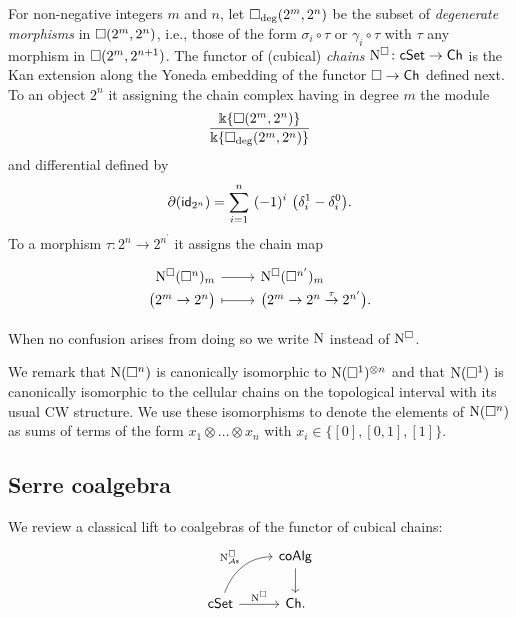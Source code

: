For non-negative integers $m$ and $n$, let $\square_{\deg}(2^m, 2^n)$ be the subset of \textit{degenerate morphisms} in $\square(2^m, 2^n)$, i.e., those of the form $\sigma_i \circ \tau$ or $\gamma_i \circ \tau$ with $\tau$ any morphism in $\square(2^m, 2^{n+1})$.
The functor of (cubical) \textit{chains} $\operatorname{N^{\square}} \colon \mathsf{cSet} \to \mathsf{Ch}$ is the Kan extension along the Yoneda embedding of the functor $\square \to \mathsf{Ch}$ defined next.
To an object $2^n$ it assigning the chain complex having in degree $m$ the module
\[
\frac{\Bbbk\{\square(2^m, 2^n)\}}{\Bbbk\{\square_{\deg}(2^m, 2^n)\}}
\]
and differential defined by
\[
\partial (\id_{2^n}) = \sum_{i=1}^{n} \ (-1)^i \
\big(\delta_i^1 - \delta_i^0 \big).
\]
To a morphism $\tau \colon 2^n \to 2^{n^\prime}$ it assigns the chain map
\[
\begin{tikzcd}[row sep=-3pt, column sep=normal,
/tikz/column 1/.append style={anchor=base east},
/tikz/column 2/.append style={anchor=base west}]
\cchains(\cube^n)_m \arrow[r] & \cchains(\cube^{n^\prime})_m \\
\big( 2^m \to 2^n \big) \arrow[r, mapsto] & \big( 2^m \to 2^n \stackrel{\tau}{\to} 2^{n^\prime} \big).
\end{tikzcd}
\]

When no confusion arises from doing so we write $\operatorname{N}$ instead of $\operatorname{N^{\square}}$.

We remark that $\operatorname{N}(\square^n)$ is canonically isomorphic to $\operatorname{N}(\square^1)^{\otimes n}$ and that $\operatorname{N}(\square^1)$ is canonically isomorphic to the cellular chains on the topological interval with its usual CW structure.
We use these isomorphisms to denote the elements of $\operatorname{N}(\square^n)$ as sums of terms of the form $x_1 \otimes \dots \otimes x_n$ with $x_i \in \big\{[0], [0,1], [1] \big\}$.

\subsection{Serre coalgebra} \label{ss:serre coalgebra}

We review a classical lift to coalgebras of the functor of cubical chains:
\[
\begin{tikzcd}
& \coAlg \arrow[d] \\
\cSet \arrow[r, "\cchains"] \arrow[ur, "\cchainsAs", out=70, in=180] & \Ch.
\end{tikzcd}
\]

